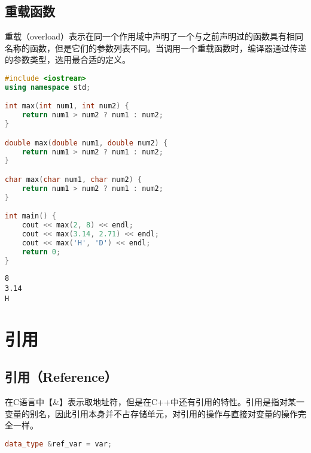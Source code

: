 \vspace{0.5cm}

\subsection{重载函数}

重载（overload）表示在同一个作用域中声明了一个与之前声明过的函数具有相同名称的函数，但是它们的参数列表不同。当调用一个重载函数时，编译器通过传递的参数类型，选用最合适的定义。\\


\begin{lstlisting}[language=C++]
#include <iostream>
using namespace std;

int max(int num1, int num2) {
    return num1 > num2 ? num1 : num2;
}

double max(double num1, double num2) {
    return num1 > num2 ? num1 : num2;
}

char max(char num1, char num2) {
    return num1 > num2 ? num1 : num2;
}

int main() {
    cout << max(2, 8) << endl;
    cout << max(3.14, 2.71) << endl;
    cout << max('H', 'D') << endl;
    return 0;
}
\end{lstlisting}

\begin{tcolorbox}
	\begin{verbatim}
8
3.14
H
	\end{verbatim}
\end{tcolorbox}

\newpage

\section{引用}

\subsection{引用（Reference）}

在C语言中【\&】表示取地址符，但是在C++中还有引用的特性。引用是指对某一变量的别名，因此引用本身并不占存储单元，对引用的操作与直接对变量的操作完全一样。

\vspace{-0.5cm}

\begin{lstlisting}[language=C++]
data_type &ref_var = var;
\end{lstlisting}

